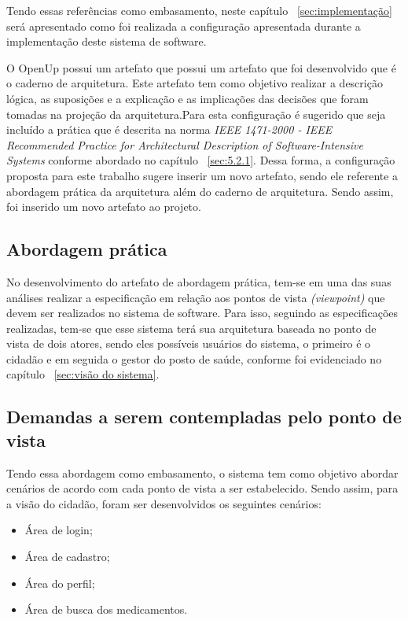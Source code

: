 Tendo essas referências como embasamento, neste capítulo ~\ref{sec:implementação} será apresentado como foi realizada a configuração apresentada durante a implementação deste sistema de software.

O \acrfull{OpenUp} possui um artefato que possui um artefato que foi desenvolvido que é o caderno de arquitetura. Este artefato tem como objetivo realizar a descrição lógica, as suposições e a explicação e as implicações das decisões que foram tomadas na projeção da arquitetura\cite{openup}.Para esta configuração é sugerido que seja incluído a prática que é descrita na norma \emph{IEEE 1471-2000 - IEEE Recommended Practice for Architectural Description of Software-Intensive Systems} conforme abordado no capítulo ~\ref{sec:5.2.1}. Dessa forma, a configuração proposta para este trabalho sugere inserir um novo artefato, sendo ele referente a abordagem prática da arquitetura além do caderno de arquitetura. Sendo assim, foi inserido um novo artefato ao projeto.

\subsection{Abordagem prática}
No desenvolvimento do artefato de abordagem prática, tem-se em uma das suas análises realizar a especificação em relação aos pontos de vista \emph{(viewpoint)} que devem ser realizados no sistema de software. Para isso, seguindo as especificações realizadas, tem-se que esse sistema terá sua arquitetura baseada no ponto de vista de dois atores, sendo eles possíveis usuários do sistema, o primeiro é o cidadão e em seguida o gestor do posto de saúde, conforme foi evidenciado no capítulo  ~\ref{sec:visão do sistema}.

\subsection{Demandas a serem contempladas pelo ponto de vista}

Tendo essa abordagem como embasamento, o sistema tem como objetivo abordar cenários de acordo com cada ponto de vista a ser estabelecido. Sendo assim, para a visão do cidadão, foram ser desenvolvidos os seguintes cenários:
\begin{itemize}
    \item Área de login;
    \item Área de cadastro;
    \item Área do perfil;
    \item Área de busca dos medicamentos.
\end{itemize}

